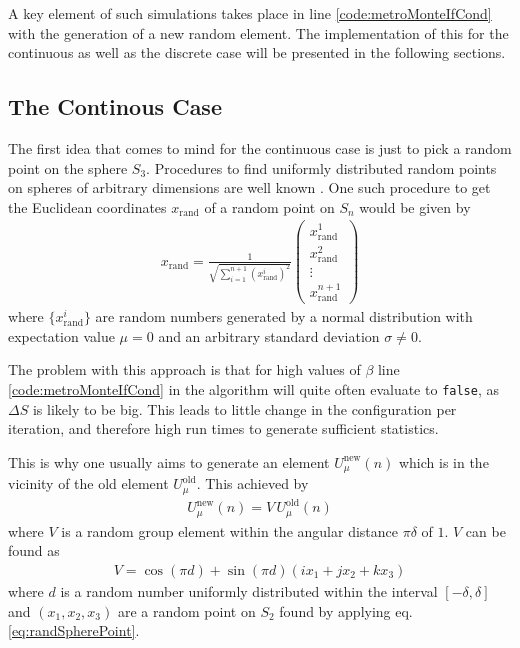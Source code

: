 A key element of such simulations takes place in line \ref{code:metroMonteIfCond} with the generation of a new random element. The implementation of this for the continuous as well as the discrete case will be presented in the following sections.

\subsection{The Continous Case}
The first idea that comes to mind for the continuous case is just to pick a random point on the sphere $S_3$. Procedures to find uniformly distributed random points on spheres of arbitrary dimensions are well known \cite{Tashiro:1977}. One such procedure to get the Euclidean coordinates $x_{\textrm{rand}}$ of a random point on $S_n$ would be given by
\begin{align}
 x_{\textrm{rand}} = \frac{1}{\sqrt{\sum_{i=1}^{n+1}(x^i_{\textrm{rand}})^2}} \begin{pmatrix}
  x^1_{\textrm{rand}} \\
  x^2_{\textrm{rand}} \\
  \vdots              \\
  x^{n+1}_{\textrm{rand}}
 \end{pmatrix}
 \label{eq:randSpherePoint}
\end{align}
where $\{x^i_{\textrm{rand}}\}$ are random numbers generated by a normal distribution with expectation value $\mu = 0$ and an arbitrary standard deviation $\sigma \neq 0$.

The problem with this approach is that for high values of $\beta$ line \ref{code:metroMonteIfCond} in the algorithm will quite often evaluate to \texttt{false}, as $\Delta S$ is likely to be big. This leads to little change in the configuration per iteration, and therefore high run times to generate sufficient statistics.

This is why one usually aims to generate an element $U_\mu^{\textrm{new}}(n)$ which is in the vicinity of the old element $U_\mu^{\textrm{old}}$. This achieved by
\begin{align*}
 U_\mu^{\textrm{new}}(n) = V \, U_\mu^{\textrm{old}} (n)
\end{align*}
where $V$ is a random group element within the angular distance $\pi \delta$ of $1$. $V$ can be found as
\begin{align}
 V = \cos (\pi d ) + \sin (\pi d) \left(i x_1  + j x_2  + k x_3\right)
 \label{eq:transitionV}
\end{align}
where $d$ is a random number uniformly distributed within the interval $[-\delta,\delta]$ and $(x_1,x_2,x_3)$ are a random point on $S_2$ found by applying eq. \ref{eq:randSpherePoint}.


